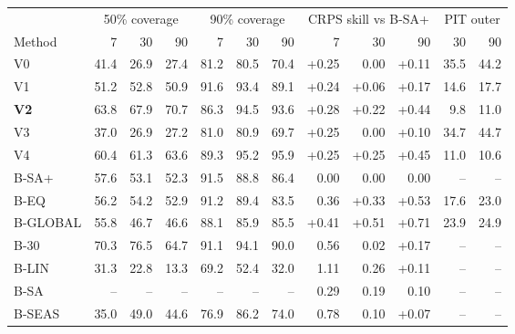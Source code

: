 \begin{tabular}{l rrr rrr rrr rr}
\toprule
 & \multicolumn{3}{c}{50\% coverage} & \multicolumn{3}{c}{90\% coverage} & \multicolumn{3}{c}{CRPS skill vs B-SA+} & \multicolumn{2}{c}{PIT outer}\\
\cmidrule(lr){2-4}\cmidrule(lr){5-7}\cmidrule(lr){8-10}\cmidrule(lr){11-12}
Method & 7 & 30 & 90 & 7 & 30 & 90 & 7 & 30 & 90 & 30 & 90\\
\midrule
V0 & 41.4 & 26.9 & 27.4 & 81.2 & 80.5 & 70.4 & +0.25 & 0.00 & +0.11 & 35.5 & 44.2 \\
V1 & 51.2 & 52.8 & 50.9 & 91.6 & 93.4 & 89.1 & +0.24 & +0.06 & +0.17 & 14.6 & 17.7 \\
\textbf{V2} & 63.8 & 67.9 & 70.7 & 86.3 & 94.5 & 93.6 & +0.28 & +0.22 & +0.44 & 9.8 & 11.0 \\
V3 & 37.0 & 26.9 & 27.2 & 81.0 & 80.9 & 69.7 & +0.25 & 0.00 & +0.10 & 34.7 & 44.7 \\
V4 & 60.4 & 61.3 & 63.6 & 89.3 & 95.2 & 95.9 & +0.25 & +0.25 & +0.45 & 11.0 & 10.6 \\
\midrule
B-SA+ & 57.6 & 53.1 & 52.3 & 91.5 & 88.8 & 86.4 & 0.00 & 0.00 & 0.00 & -- & -- \\
B-EQ & 56.2 & 54.2 & 52.9 & 91.2 & 89.4 & 83.5 & \textminus{}0.36 & +0.33 & +0.53 & 17.6 & 23.0 \\
B-GLOBAL & 55.8 & 46.7 & 46.6 & 88.1 & 85.9 & 85.5 & +0.41 & +0.51 & +0.71 & 23.9 & 24.9 \\
B-30 & 70.3 & 76.5 & 64.7 & 91.1 & 94.1 & 90.0 & \textminus{}0.56 & \textminus{}0.02 & +0.17 & -- & -- \\
B-LIN & 31.3 & 22.8 & 13.3 & 69.2 & 52.4 & 32.0 & \textminus{}1.11 & \textminus{}0.26 & +0.11 & -- & -- \\
B-SA & -- & -- & -- & -- & -- & -- & \textminus{}0.29 & \textminus{}0.19 & \textminus{}0.10 & -- & -- \\
B-SEAS & 35.0 & 49.0 & 44.6 & 76.9 & 86.2 & 74.0 & \textminus{}0.78 & \textminus{}0.10 & +0.07 & -- & -- \\
\bottomrule
\end{tabular}
